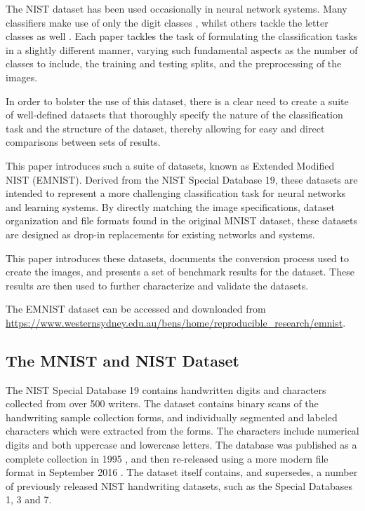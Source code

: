 \documentclass[conference]{IEEEtran}
\begin{document}
The NIST dataset has been used occasionally in neural network systems. Many classifiers make use of only the digit classes \cite{Milgram2005, Granger2007}, whilst others tackle the letter classes as well \cite{Radtke2008, Ciresan2011, Koerich2005, Cavalin2006}. Each paper tackles the task of formulating the classification tasks in a slightly different manner, varying such fundamental aspects as the number of classes to include, the training and testing splits, and the preprocessing of the images. 

In order to bolster the use of this dataset, there is a clear need to create a suite of well-defined datasets that thoroughly specify the nature of the classification task and the structure of the dataset, thereby allowing for easy and direct comparisons between sets of results.

This paper introduces such a suite of datasets, known as Extended Modified NIST (EMNIST). Derived from the NIST Special Database 19, these datasets are intended to represent a more challenging classification task for neural networks and learning systems. By directly matching the image specifications, dataset organization and file formats found in the original MNIST dataset, these datasets are designed as drop-in replacements for existing networks and systems. 

This paper introduces these datasets, documents the conversion process used to create the images, and presents a set of benchmark results for the dataset. These results are then used to further characterize and validate the datasets.

The EMNIST dataset can be accessed and downloaded from \url{https://www.westernsydney.edu.au/bens/home/reproducible_research/emnist}.

\subsection{The MNIST and NIST Dataset}
\label{sec:the-datasets}

The NIST Special Database 19 \cite{Grother1995} contains handwritten digits and characters collected from over 500 writers. The dataset contains binary scans of the handwriting sample collection forms, and individually segmented and labeled characters which were extracted from the forms. The characters include numerical digits and both uppercase and lowercase letters. The database was published as a complete collection in 1995 \cite{Grother1995}, and then re-released using a more modern file format in September 2016 \cite{Grother2016}. The dataset itself contains, and supersedes, a number of previously released NIST handwriting datasets, such as the Special Databases 1, 3 and 7. 
\end{document}
